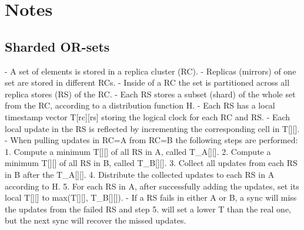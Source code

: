 \appendix
\chapter{Notes}

\section{Sharded OR-sets}

\begin{spverbatim}
- A set of elements is stored in a replica cluster (RC).
- Replicas (mirrors) of one set are stored in different RCs.
- Inside of a RC the set is partitioned across all replica stores (RS) of the RC.
- Each RS stores a subset (shard) of the whole set from the RC, according to a distribution function H.
- Each RS has a local timestamp vector T[rc][rs] storing the logical clock for each RC and RS.
- Each local update in the RS is reflected by incrementing the corresponding cell in T[][].
- When pulling updates in RC=A from RC=B the following steps are performed:
	1. Compute a minimum T[][] of all RS in A, called T_A[][].
	2. Compute a minimum T[][] of all RS in B, called T_B[][].
	3. Collect all updates from each RS in B after the T_A[][].
	4. Distribute the collected updates to each RS in A according to H.
	5. For each RS in A, after successfully adding the updates, set its local T[][] to max(T[][], T_B[][]).
- If a RS fails in either A or B, a sync will miss the updates from the failed RS and step 5. will set a lower T than the real one, but the next sync will recover the missed updates.
\end{spverbatim}

